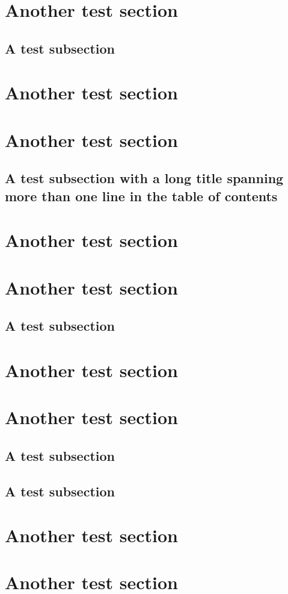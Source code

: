\documentclass{memoir}
\begin{document}
\section{Another test section}
\subsection{A test subsection}
\section{Another test section}
\section{Another test section}
\subsection{A test subsection with a long title spanning more than one line in the table of contents}
\section{Another test section}
\section{Another test section}
\subsection{A test subsection}
\section{Another test section}
\section{Another test section}
\subsection{A test subsection}
\subsection{A test subsection}
\section{Another test section}
\section{Another test section}
\end{document}
